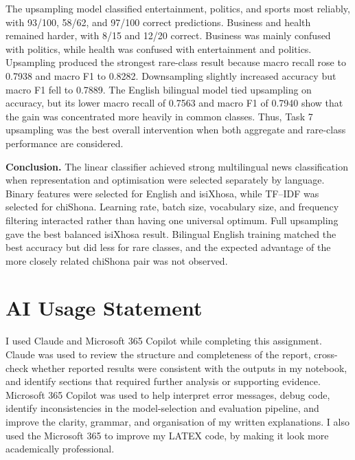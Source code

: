 \documentclass[10pt,a4paper]{article}
\begin{document}
The upsampling model classified entertainment, politics, and sports most reliably, with 93/100, 58/62, and 97/100 correct predictions. Business and health remained harder, with 8/15 and 12/20 correct. Business was mainly confused with politics, while health was confused with entertainment and politics. Upsampling produced the strongest rare-class result because macro recall rose to 0.7938 and macro F1 to 0.8282. Downsampling slightly increased accuracy but macro F1 fell to 0.7889. The English bilingual model tied upsampling on accuracy, but its lower macro recall of 0.7563 and macro F1 of 0.7940 show that the gain was concentrated more heavily in common classes. Thus, Task 7 upsampling was the best overall intervention when both aggregate and rare-class performance are considered.

\textbf{Conclusion.}
The linear classifier achieved strong multilingual news classification when representation and optimisation were selected separately by language. Binary features were selected for English and isiXhosa, while TF--IDF was selected for chiShona. Learning rate, batch size, vocabulary size, and frequency filtering interacted rather than having one universal optimum. Full upsampling gave the best balanced isiXhosa result. Bilingual English training matched the best accuracy but did less for rare classes, and the expected advantage of the more closely related chiShona pair was not observed.

\section*{AI Usage Statement} I used Claude and Microsoft 365 Copilot while completing this assignment. Claude was used to review the structure and completeness of the report, cross-check whether reported results were consistent with the outputs in my notebook, and identify sections that required further analysis or supporting evidence. Microsoft 365 Copilot was used to help interpret error messages, debug code, identify inconsistencies in the model-selection and evaluation pipeline, and improve the clarity, grammar, and organisation of my written explanations. I also used the Microsoft 365 to improve my LATEX code, by making it look more academically professional.
\end{document}
